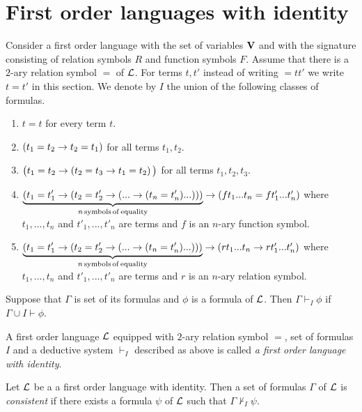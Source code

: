 \section{First order languages with identity}
\noindent
Consider a first order language with the set of variables $\mathbf{V}$ and with the signature consisting of relation symbols $R$ and function symbols $F$. Assume that there is a $2$-ary relation symbol $=$ of ${\mathcal L}$. For terms $t,t'$ instead of writing $=tt'$ we write $t = t'$ in this section. We denote by $I$ the union of the following classes of formulas.
\begin{enumerate}[label=\textbf{(\arabic*)}, leftmargin=3.0em]
\item $t = t$ for every term $t$. 
\item $(t_1 = t_2 \rightarrow t_2 = t_1)$ for all terms $t_1,t_2$.
\item $\big(t_1 = t_2 \rightarrow \left(t_2 = t_3\rightarrow t_1 = t_2\right)\big)$ for all terms $t_1,t_2,t_3$.
\item $\underbrace{\left(t_1 = t'_1 \rightarrow \left( t_2 = t'_2 \rightarrow \left(... \rightarrow (t_n = t'_n)...\right)\right)\right)}_{n\,\mathrm{symbols\,of\,equality}} \rightarrow \left(ft_1...t_n = ft'_1...t'_n\right)$ where $t_1,...,t_n$ and $t'_1,...,t'_n$ are terms and $f$ is an $n$-ary function symbol.
\item $\underbrace{\left(t_1 = t'_1 \rightarrow \left( t_2 = t'_2 \rightarrow \left(... \rightarrow (t_n = t'_n)...\right)\right)\right)}_{n\,\mathrm{symbols\,of\,equality}} \rightarrow \left(rt_1...t_n \rightarrow rt'_1...t'_n\right)$ where $t_1,...,t_n$ and $t'_1,...,t'_n$ are terms and $r$ is an $n$-ary relation symbol.
\end{enumerate}

\begin{definition}
Suppose that $\Gamma$ is set of its formulas and $\phi$ is a formula of ${\mathcal L}$. Then $\Gamma \vdash_I \phi$ if $\Gamma\cup I \vdash \phi$.
\end{definition}

\begin{definition}
A first order language ${\mathcal L}$ equipped with $2$-ary relation symbol $=$, set of formulas $I$ and a deductive system $\vdash_I$ described as above is called \textit{a first order language with identity}.
\end{definition}

\begin{definition}
Let ${\mathcal L}$ be a a first order language with identity. Then a set of formulas $\Gamma$ of ${\mathcal L}$ is \textit{consistent} if there exists a formula $\psi$ of ${\mathcal L}$ such that $\Gamma \nvdash_I \psi$.
\end{definition}

